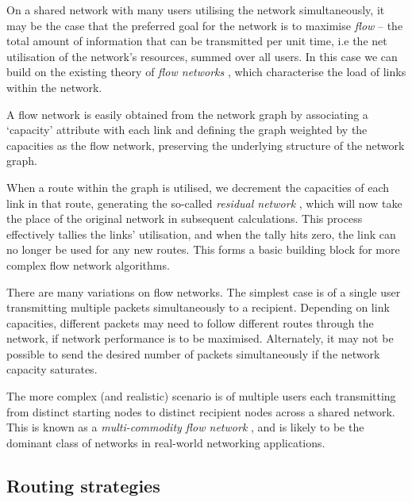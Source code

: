 On a shared network with many users utilising the network simultaneously, it may be the case that the preferred goal for the network is to maximise \textit{flow} \cite{???} -- the total amount of information that can be transmitted per unit time, i.e the net utilisation of the network's resources, summed over all users. In this case we can build on the existing theory of \textit{flow networks} \cite{???}, which characterise the load of links within the network.

A flow network is easily obtained from the network graph by associating a `capacity' attribute with each link and defining the graph weighted by the capacities as the flow network, preserving the underlying structure of the network graph.

When a route within the graph is utilised, we decrement the capacities of each link in that route, generating the so-called \textit{residual network} \cite{???}, which will now take the place of the original network in subsequent calculations. This process effectively tallies the links' utilisation, and when the tally hits zero, the link can no longer be used for any new routes. This forms a basic building block for more complex flow network algorithms.

There are many variations on flow networks. The simplest case is of a single user transmitting multiple packets simultaneously to a recipient. Depending on link capacities, different packets may need to follow different routes through the network, if network performance is to be maximised. Alternately, it may not be possible to send the desired number of packets simultaneously if the network capacity saturates.

The more complex (and realistic) scenario is of multiple users each transmitting from distinct starting nodes to distinct recipient nodes across a shared network. This is known as a \textit{multi-commodity flow network} \cite{???}, and is likely to be the dominant class of networks in real-world networking applications.

%
%

\subsection{Routing strategies} \label{sec:route_strats} 

